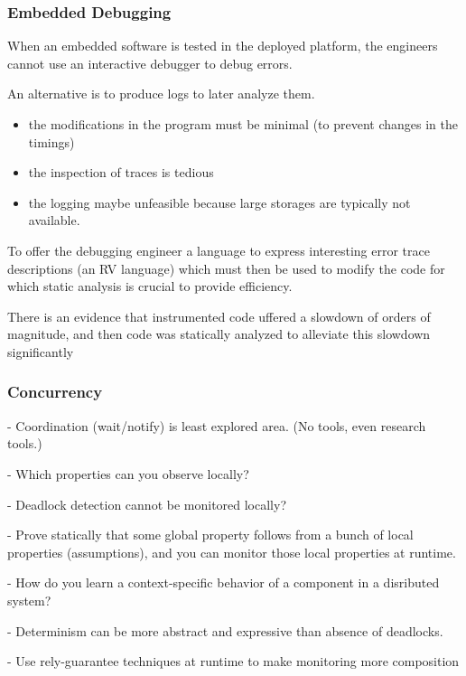 \documentclass{beamer}
\begin{document}
\begin{frame}
  \frametitle{Embedded Debugging}


When an embedded software is tested in the deployed platform, the
engineers cannot use an interactive debugger to debug errors. 

An alternative is to produce logs to later analyze them.
\begin{itemize} 
\item the modifications in the program must be minimal (to prevent changes in
the timings) 
\item the inspection of traces is tedious
\item the logging
maybe unfeasible because large storages are typically not available. 
\end{itemize}

To offer the debugging engineer a language to
express interesting error trace descriptions (an RV language) which
must then be used to modify the code for which static analysis is
crucial to provide efficiency. 

There is an evidence that
instrumented code uffered a slowdown of orders of magnitude, and
then code was statically analyzed to alleviate this slowdown
significantly 

\end{frame}


\begin{frame}
  \frametitle{Concurrency}

- Coordination (wait/notify) is least explored area. (No tools, even research tools.)

- Which properties can you observe locally? 

- Deadlock detection cannot be monitored locally?

- Prove statically that some global property follows from a bunch of local properties (assumptions), and you can monitor those local properties at runtime.

- How do you learn a context-specific behavior of a component in a disributed system?

- Determinism can be more abstract and expressive than absence of deadlocks.

- Use rely-guarantee techniques at runtime to make monitoring more composition

\end{frame}
\end{document}
